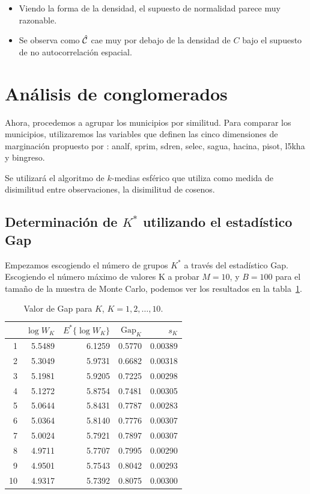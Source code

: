 \begin{itemize}
\item Viendo la forma de la densidad, el supuesto de normalidad parece muy razonable.  
\item Se observa como $\Hat{\mathcal{C}}$ cae muy por debajo de la densidad de $C$ bajo el supuesto de no autocorrelación espacial. 
\end{itemize}




\section{Análisis de conglomerados}
Ahora, procedemos a agrupar los municipios por similitud. Para comparar los municipios, utilizaremos las variables que definen las cinco dimensiones de marginación propuesto por \citet{conapo04}: analf, sprim, sdren, selec, sagua, hacina, pisot, l5kha y bingreso.

Se utilizará el algoritmo de $k$-medias esférico que utiliza como medida de disimilitud entre observaciones, la disimilitud de cosenos.

\subsection{Determinación de $K^*$ utilizando el estadístico Gap}

Empezamos escogiendo el número de grupos $K^*$ a través del estadístico Gap. Escogiendo el número máximo de valores K a probar $M=10$, y $B=100$ para el tamaño de la muestra de Monte Carlo, podemos ver los resultados en la tabla~\ref{tab:gaptable}.

\begin{table}[ht]
\centering
\begin{tabular}{rrrrr}
  \hline
 & $\log{W_K}$ & $E^*\lbrace \log{W_K} \rbrace $ & $\mbox{Gap}_K$ & $s_K$ \\ 
  \hline
  1 & 5.5489 & 6.1259 & 0.5770 & 0.00389 \\ 
  2 & 5.3049 & 5.9731 & 0.6682 & 0.00318 \\ 
  3 & 5.1981 & 5.9205 & 0.7225 & 0.00298 \\ 
  4 & 5.1272 & 5.8754 & 0.7481 & 0.00305 \\ 
  5 & 5.0644 & 5.8431 & 0.7787 & 0.00283 \\ 
  6 & 5.0364 & 5.8140 & 0.7776 & 0.00307 \\ 
  7 & 5.0024 & 5.7921 & 0.7897 & 0.00307 \\ 
  8 & 4.9711 & 5.7707 & 0.7995 & 0.00290 \\ 
  9 & 4.9501 & 5.7543 & 0.8042 & 0.00293 \\ 
  10 & 4.9317 & 5.7392 & 0.8075 & 0.00300 \\ 
   \hline
\end{tabular}
\caption{Valor de Gap para $K$, $K=1,2, \dots, 10$. \label{tab:gaptable}}
\end{table}

